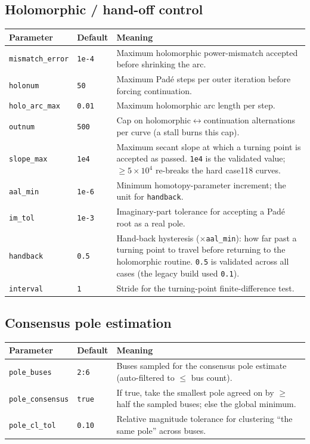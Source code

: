 \documentclass[11pt,a4paper]{article}
\newcommand{\code}[1]{\texttt{#1}}
\begin{document}
\subsection{Holomorphic / hand-off control}
\begin{center}\small
\begin{longtable}{@{}p{}p{}p{}@{}}
\toprule
\textbf{Parameter} & \textbf{Default} & \textbf{Meaning}\\
\midrule\endhead
\code{mismatch_error}& \code{1e-4} & Maximum holomorphic power-mismatch accepted before shrinking the arc.\\
\code{holonum}      & \code{50}   & Maximum Pad\'e steps per outer iteration before forcing continuation.\\
\code{holo_arc_max} & \code{0.01} & Maximum holomorphic arc length per step.\\
\code{outnum}       & \code{500}  & Cap on holomorphic$\leftrightarrow$continuation alternations per curve (a stall burns this cap).\\
\code{slope_max}    & \code{1e4}  & Maximum secant slope at which a turning point is accepted as passed. \code{1e4} is the validated value; $\ge 5\!\times\!10^4$ re-breaks the hard case118 curves.\\
\code{aal_min}      & \code{1e-6} & Minimum homotopy-parameter increment; the unit for \code{handback}.\\
\code{im_tol}       & \code{1e-3} & Imaginary-part tolerance for accepting a Pad\'e root as a real pole.\\
\code{handback}     & \code{0.5}  & Hand-back hysteresis ($\times$\code{aal_min}): how far past a turning point to travel before returning to the holomorphic routine. \code{0.5} is validated across all cases (the legacy build used \code{0.1}).\\
\code{interval}     & \code{1}    & Stride for the turning-point finite-difference test.\\
\bottomrule
\end{longtable}
\end{center}

\subsection{Consensus pole estimation}
\begin{center}\small
\begin{longtable}{@{}p{}p{}p{}@{}}
\toprule
\textbf{Parameter} & \textbf{Default} & \textbf{Meaning}\\
\midrule\endhead
\code{pole_buses}     & \code{2:6}      & Buses sampled for the consensus pole estimate (auto-filtered to $\le$ bus count).\\
\code{pole_consensus}  & \code{true}     & If true, take the smallest pole agreed on by $\ge$ half the sampled buses; else the global minimum.\\
\code{pole_cl_tol}     & \code{0.10}     & Relative magnitude tolerance for clustering ``the same pole'' across buses.\\
\bottomrule
\end{longtable}
\end{center}
\end{document}
